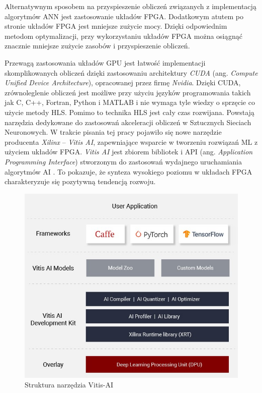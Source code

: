Alternatywnym sposobem na przyspieszenie obliczeń związanych z implementacją algorytmów ANN jest zastosowanie układów FPGA. Dodatkowym atutem po stronie układów FPGA jest mniejsze zużycie mocy. Dzięki odpowiednim metodom optymalizacji, przy wykorzystaniu układów FPGA można osiągnąć znacznie mniejsze zużycie zasobów i przyspieszenie obliczeń.

Przewagą zastosowania układów GPU jest łatwość implementacji skomplikowanych obliczeń dzięki zastosowaniu architektury \emph
{CUDA} (ang. \emph{Compute Unified Device Architecture}), opracowanej przez firmę \emph{Nvidia}. Dzięki CUDA, zrównoleglenie obliczeń jest możliwe przy użyciu języków programowania takich jak C, C++, Fortran, Python i MATLAB \cite{cuda} i nie wymaga tyle wiedzy o sprzęcie co użycie metody HLS. Pomimo to technika HLS jest cały czas rozwijana. Powstają narzędzia dedykowane do zastosowań akceleracji obliczeń w Sztucznych Sieciach Neuronowych. W trakcie pisania tej pracy pojawiło się nowe narzędzie producenta \emph{Xilinx} -- \emph{Vitis AI}, zapewniające wsparcie w tworzeniu rozwiązań ML z użyciem układów FPGA. \emph{Vitis AI} jest zbiorem bibliotek i API (ang. \emph{Application Programming Interface}) stworzonym do zastosowań wydajnego uruchamiania algorytmów AI \cite{vitis-ai}. To pokazuje, że synteza wysokiego poziomu w układach FPGA charakteryzuje się pozytywną tendencją rozwoju.

\begin{figure}[h]
    \centering
    \includegraphics[width=\textwidth]{img/vitis-AI.jpg}
    \caption{Struktura narzędzia Vitis-AI \cite{vitis-AI-obraz}}
    \label{vitisAI}
  \end{figure}

